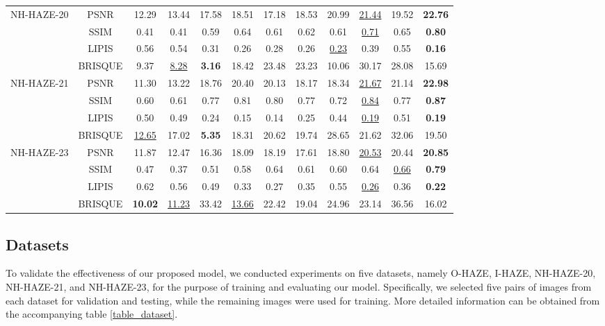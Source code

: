 \documentclass[lettersize,journal]{IEEEtran}
\begin{document}
\begin{table}
\begin{center}
{\begin{tabular}{ c | c | c | c | c | c | c | c | c | c | c | c }
				\multirow{4}{*}{NH-HAZE-20} & PSNR & 12.29 & 13.44 & 17.58 & 18.51 & 17.18 & 18.53 & 20.99 & \underline{21.44} & 19.52 & \textbf{22.76} \\
				& SSIM & 0.41 & 0.41 & 0.59 & 0.64 & 0.61 & 0.62 & 0.61 & \underline{0.71} & 0.65 & \textbf{0.80} \\
				& LIPIS & 0.56 & 0.54 & 0.31 & 0.26 & 0.28 & 0.26 & \underline{0.23} & 0.39 & 0.55 & \textbf{0.16} \\
				& BRISQUE & 9.37 & \underline{8.28} & \textbf{3.16} & 18.42 & 23.48 & 23.23 & 10.06 & 30.17 & 28.08 & 15.69 \\
				\hline
				
				\multirow{4}{*}{NH-HAZE-21} & PSNR & 11.30 & 13.22 & 18.76 & 20.40 & 20.13 & 18.17 & 18.34 & \underline{21.67} & 21.14 & \textbf{22.98} \\
				& SSIM & 0.60 & 0.61 & 0.77 & 0.81 & 0.80 & 0.77 & 0.72 & \underline{0.84} & 0.77 & \textbf{0.87} \\
				& LIPIS & 0.50 & 0.49 & 0.24 & 0.15 & 0.14 & 0.25 & 0.44 & \underline{0.19} & 0.51 & \textbf{0.19} \\
				& BRISQUE & \underline{12.65} & 17.02 & \textbf{5.35} & 18.31 & 20.62 & 19.74 & 28.65 & 21.62 & 32.06 & 19.50 \\
				\hline
				
				\multirow{4}{*}{NH-HAZE-23} & PSNR & 11.87 & 12.47 & 16.36 & 18.09 & 18.19 & 17.61 & 18.80 & \underline{20.53} & 20.44 & \textbf{20.85} \\
				& SSIM & 0.47 & 0.37 & 0.51 & 0.58 & 0.64 & 0.61 & 0.60 & 0.64 & \underline{0.66} & \textbf{0.79} \\
				& LIPIS & 0.62 & 0.56 & 0.49 & 0.33 & 0.27 & 0.35 & 0.55 & \underline{0.26} & 0.36 & \textbf{0.22} \\
				& BRISQUE & \textbf{10.02} & \underline{11.23} & 33.42 & \underline{13.66} & 22.42 & 19.04 & 24.96 & 23.14 & 36.56 & 16.02 \\
				\hline			
			\end{tabular}
		}
		
	\end{center}
\end{table}

\subsection{Datasets}
To validate the effectiveness of our proposed model, we conducted experiments on five datasets, namely O-HAZE\cite{ancuti2018ohaze}, I-HAZE\cite{ancuti2018ihaze}, NH-HAZE-20\cite{ancuti2020ntire}, NH-HAZE-21\cite{ancuti2021ntire}, and NH-HAZE-23\cite{ancuti2023ntire}, for the purpose of training and evaluating our model. Specifically, we selected five pairs of images from each dataset for validation and testing, while the remaining images were used for training. More detailed information can be obtained from the accompanying table \ref{table_dataset}.
\end{document}
